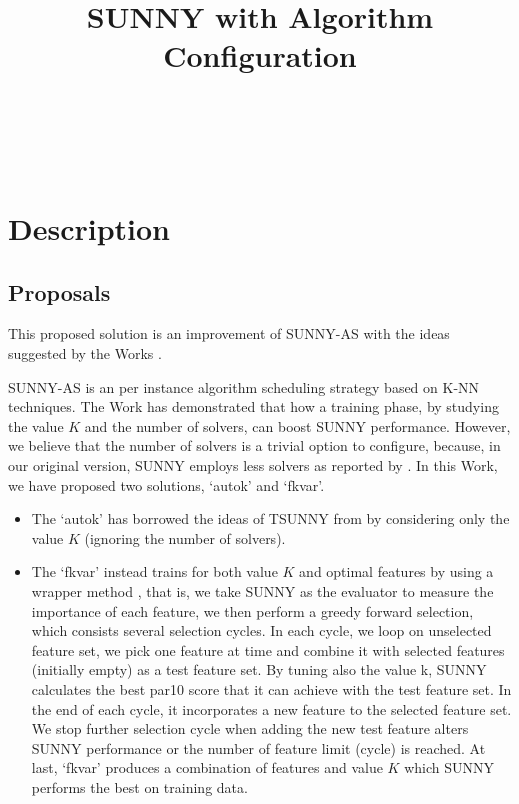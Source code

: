 \documentclass[tablecaption=bottom,wcp]{jmlr} %
\title[SUNNY-OASC]{SUNNY with Algorithm Configuration}
\author{\Name{Tong Liu} \Email{t.liu@unibo.it}\\
   \Name{Roberto Amadini} \Email{roberto.amadini@unimelb.edu.au}\\
   \Name{Jacopo Mauro} \Email{mauro.jacopo@gmail.com}\\
    }
\begin{document}
\maketitle



\section{Description}

\subsection{Proposals}
This proposed solution is an improvement of SUNNY-AS \cite{DBLP:conf/cilc/AmadiniBGLM15,sunnyas} with the ideas suggested by the Works \cite{DBLP:conf/lion/LindauerBH16,Kohavi97wrappersfor}.

SUNNY-AS is an per instance algorithm scheduling strategy based on K-NN techniques. The Work \cite{DBLP:conf/lion/LindauerBH16} has demonstrated that how a training phase, by studying the value $K$ and the number of solvers, can boost SUNNY performance. However, we believe that the number of solvers is a trivial option to configure, because, in our original version, SUNNY employs less solvers as reported by \cite{DBLP:conf/lion/LindauerBH16}. In this Work, we have proposed two solutions, `autok' and `fkvar'. 

\begin{itemize}
  \item The `autok' has borrowed the ideas of TSUNNY from \cite{DBLP:conf/lion/LindauerBH16} by considering only the value $K$ (ignoring the number of solvers). 
  \item The `fkvar' instead trains for both value $K$ and optimal features by using a wrapper method \cite{Kohavi97wrappersfor}, that is, we take SUNNY as the evaluator to measure the importance of each feature, we then perform a greedy forward selection, which consists several selection cycles. In each cycle, we loop on unselected feature set, we pick one feature at time and combine it with selected features (initially empty) as a test feature set. By tuning also the value k, SUNNY calculates the best par10 score that it can achieve with the test feature set. In the end of each cycle, it incorporates a new feature to the selected feature set. We stop further selection cycle when adding the new test feature alters SUNNY performance or the number of feature limit (cycle) is reached. At last, `fkvar' produces a combination of features and value $K$ which SUNNY performs the best on training data.
\end{itemize}
 
\end{document}
